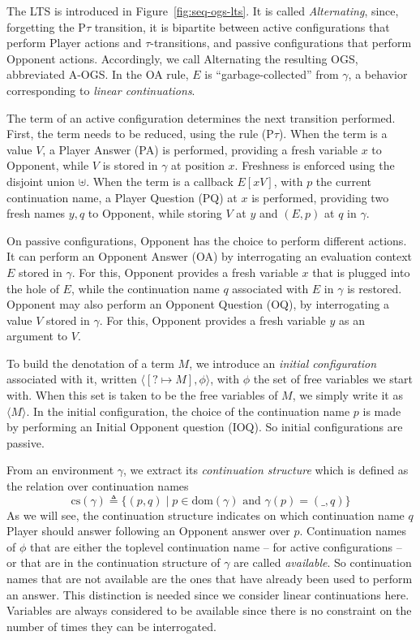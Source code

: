 \documentclass[11pt,a4paper]{amsart}
\theoremstyle{plain}
\theoremstyle{definition}
\theoremstyle{defC}
\theoremstyle{thmC}
\theoremstyle{plain}
\numberwithin{equation}{section}
\newcommand{\AOGS}{\mbox{{\rm A-OGS}}\xspace}      %
\newcommand{\defeq}{\mathrel{\triangleq}}
\newcommand{\dom}[1]{\mathrm{dom}(#1)}
\newcommand{\conf}[1]{\langle #1\rangle}
\newcommand{\initconf}[2]{\langle[? \mapsto #2], #1\rangle}
\newcommand{\cs}{\mathrm{cs}}
\theoremstyle{plain}
\theoremstyle{definition}
\begin{document}
The LTS is introduced in Figure~\ref{fig:seq-ogs-lts}.
It is called \emph{Alternating}, since, forgetting the P$\tau$ transition,
it is bipartite between active configurations that perform Player actions and $\tau$-transitions,
and passive configurations that perform Opponent actions.  
Accordingly, we call Alternating the resulting OGS, abbreviated \AOGS. 
In the OA rule, $E$ is ``garbage-collected''  from $\gamma$,
a behavior corresponding to \emph{linear continuations}.

 
The term of an active configuration determines the next transition performed.
First, the term needs to be reduced, using the rule (P$\tau$).
When the term is a value $V$, a Player Answer (PA) is performed,
providing a fresh variable $x$ to Opponent, while $V$ is stored in $\gamma$ at position $x$. 
Freshness is enforced using the disjoint union $\uplus$.
When the term is a callback $E[xV]$, with $p$ the current continuation name,
a Player Question (PQ) at $x$ is performed, providing two fresh names $y,q$
to Opponent, while storing $V$ at $y$ and $(E,p)$ at $q$ in $\gamma$.

 
On passive configurations, Opponent has the choice to perform different actions.
It can  perform an Opponent Answer (OA) by interrogating an evaluation context 
$E$ stored in $\gamma$. For this, Opponent provides a fresh variable $x$ that is plugged into the hole of $E$,
while the continuation name $q$ associated with $E$ in $\gamma$ is restored.
Opponent may also  perform  an Opponent Question (OQ),
by interrogating a value $V$ stored in $\gamma$. 
For this, Opponent provides a fresh variable $y$ as an argument to $V$.


To build the denotation of a term $M$, we introduce an \emph{initial
configuration} associated with it, 
written $\initconf{\phi}{M}$, with $\phi$ the set of free variables we start with.
When this set is taken to be the free variables of $M$, we simply write it as $\conf{M}$.
In the initial configuration, the choice of the continuation
name $p$ is made by performing an Initial Opponent question
(IOQ). So initial configurations are passive.

From an environment $\gamma$, we extract its \emph{continuation structure}
which is defined
as the relation over continuation names 
\[\cs(\gamma) \defeq \{(p,q) \mid p \in \dom{\gamma} \text{ and } \gamma(p) = (\_,q)\}\]
As we will see, the continuation structure indicates
on which continuation name $q$ Player should answer 
following an Opponent answer over $p$.
Continuation names of $\phi$ that are either
the toplevel continuation name -- for active configurations --
or that are in the continuation structure of $\gamma$ are called \emph{available}.
So continuation names that are not available are the ones that
have already been used to perform an answer.
This distinction is needed since we consider linear continuations here.
Variables are always considered to be available since there is
no constraint on the number of times they can be interrogated.
\end{document}
